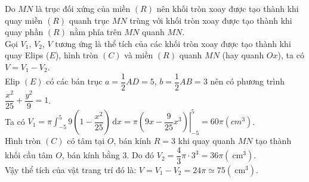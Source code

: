 \begin{bt}
{\begin{center}
		\end{center}
		Do $M  N$ là trục đối xứng của miền $(R)$ nên khối tròn xoay được tạo thành khi quay miền $(R)$ quanh trục $MN$ trùng với khối tròn xoay được tạo thành khi quay phần $(R)$ nằm phía trên $MN$ quanh $MN$.\\
		Gọi $V_{1}$, $V_{2}$, $V$ tương ứng là thể tích của các khối tròn xoay được tạo thành khi quay Elips ($E$), hình  tròn $(C)$ và miền $(R)$ quanh $MN$ (hay quanh $Ox$), ta có $V=V_{1}-V_{2}$.\\
		Elip $(E)$  có các bán trục $a=\dfrac{1}{2} AD=5$, $b=\dfrac{1}{2} A B=3$ nên có phương trình $\dfrac{x^2}{25}+\dfrac{y^2}{9}=1$.\\
		Ta có $V_{1}=\pi \displaystyle\int_{-5}^{5} 9\left(1-\dfrac{x^2}{25}\right) \mathrm{\,d} x=\left.\pi\left(9 x-\dfrac{9}{25} x^{3}\right)\right|_{-5}^{5}=60 \pi \left(cm^{3}\right)$.\\ 
		Hình tròn $(C)$ có tâm tại $O$, bán kính $R=3$ khi quay quanh $M N$ tạo thành khối cầu tâm $O$, bán kính  bằng $3$. Do đó $V_{2}=\dfrac{4}{3} \pi \cdot 3^{3}=36 \pi\left(\mathrm{~cm}^{3}\right)$.\\
		Vậy thể tích của vật trang trí đó là: $V=V_{1}-V_{2}=24  \pi \simeq 75\left(\mathrm{~cm}^{3}\right)$.\\
	} 
\end{bt}

